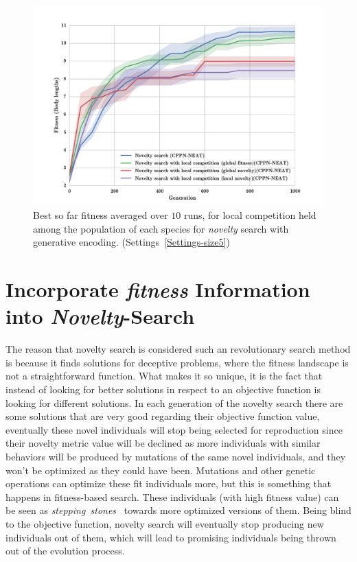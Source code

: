 \begin{figure}[t!]
\centering
\includegraphics[width=1.0\textwidth]{../Figures/Results/NoveltyCompetitionsSize5.pdf}
\caption{Best so far fitness averaged over $10$ runs, for local competition held among the population of each species for \emph{novelty} search with generative encoding. (Settings~\ref{Settings-size5})}
\label{fig:NoveltyCompetitionsSize5}
\end{figure}



\section{Incorporate \emph{fitness} Information into \emph{Novelty}-Search}

The reason that novelty search is considered such an revolutionary search method is because it finds solutions for deceptive problems, where the fitness landscape is not a straightforward function. What makes it so unique, it is the fact that instead of looking for better solutions in respect to an objective function is looking for different solutions. In each generation of the novelty search there are some solutions that are very good regarding their objective function value, eventually these novel individuals will stop being selected for reproduction since their novelty metric value will be declined as more individuals with similar behaviors will be produced by mutations of the same novel individuals, and they won't be optimized as they could have been. Mutations and other genetic operations can optimize these fit individuals more, but this is something that happens in fitness-based search. These individuals (with high fitness value) can be seen as \emph{stepping~stones}~\cite{lehman2011abandoning} towards more optimized versions of them. Being blind to the objective function, novelty search will eventually stop producing new individuals out of them, which will lead to promising individuals being thrown out of the evolution process. 

